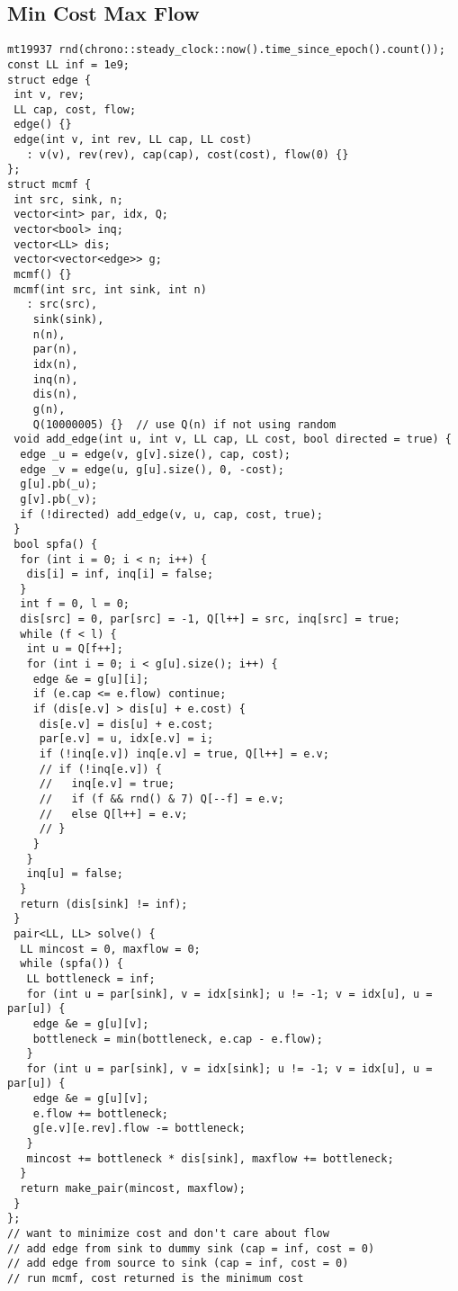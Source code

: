 \documentclass[a4paper,11pt,oneside]{article}
\begin{document}
\begin{multicols*}{\COLS}
\subsection{Min Cost Max Flow}
\begin{lstlisting}
mt19937 rnd(chrono::steady_clock::now().time_since_epoch().count());
const LL inf = 1e9;
struct edge {
 int v, rev;
 LL cap, cost, flow;
 edge() {}
 edge(int v, int rev, LL cap, LL cost)
   : v(v), rev(rev), cap(cap), cost(cost), flow(0) {}
};
struct mcmf {
 int src, sink, n;
 vector<int> par, idx, Q;
 vector<bool> inq;
 vector<LL> dis;
 vector<vector<edge>> g;
 mcmf() {}
 mcmf(int src, int sink, int n)
   : src(src),
    sink(sink),
    n(n),
    par(n),
    idx(n),
    inq(n),
    dis(n),
    g(n),
    Q(10000005) {}  // use Q(n) if not using random
 void add_edge(int u, int v, LL cap, LL cost, bool directed = true) {
  edge _u = edge(v, g[v].size(), cap, cost);
  edge _v = edge(u, g[u].size(), 0, -cost);
  g[u].pb(_u);
  g[v].pb(_v);
  if (!directed) add_edge(v, u, cap, cost, true);
 }
 bool spfa() {
  for (int i = 0; i < n; i++) {
   dis[i] = inf, inq[i] = false;
  }
  int f = 0, l = 0;
  dis[src] = 0, par[src] = -1, Q[l++] = src, inq[src] = true;
  while (f < l) {
   int u = Q[f++];
   for (int i = 0; i < g[u].size(); i++) {
    edge &e = g[u][i];
    if (e.cap <= e.flow) continue;
    if (dis[e.v] > dis[u] + e.cost) {
     dis[e.v] = dis[u] + e.cost;
     par[e.v] = u, idx[e.v] = i;
     if (!inq[e.v]) inq[e.v] = true, Q[l++] = e.v;
     // if (!inq[e.v]) {
     //   inq[e.v] = true;
     //   if (f && rnd() & 7) Q[--f] = e.v;
     //   else Q[l++] = e.v;
     // }
    }
   }
   inq[u] = false;
  }
  return (dis[sink] != inf);
 }
 pair<LL, LL> solve() {
  LL mincost = 0, maxflow = 0;
  while (spfa()) {
   LL bottleneck = inf;
   for (int u = par[sink], v = idx[sink]; u != -1; v = idx[u], u = par[u]) {
    edge &e = g[u][v];
    bottleneck = min(bottleneck, e.cap - e.flow);
   }
   for (int u = par[sink], v = idx[sink]; u != -1; v = idx[u], u = par[u]) {
    edge &e = g[u][v];
    e.flow += bottleneck;
    g[e.v][e.rev].flow -= bottleneck;
   }
   mincost += bottleneck * dis[sink], maxflow += bottleneck;
  }
  return make_pair(mincost, maxflow);
 }
};
// want to minimize cost and don't care about flow
// add edge from sink to dummy sink (cap = inf, cost = 0)
// add edge from source to sink (cap = inf, cost = 0)
// run mcmf, cost returned is the minimum cost
\end{lstlisting}

\end{multicols*}
\end{document}
